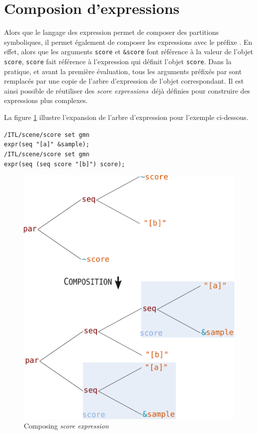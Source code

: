 \documentclass{article}
\newcommand{\OSC}[1]{\texttt{#1}}
\newcommand{\oper}[1]{\textcolor{figRed}{#1}}
\newcommand{\param}[1]{\textcolor{figOrange}{#1}}
\newcommand{\prefix}[1]{\textcolor{figBlue}{#1}}
\newcommand{\sExpr}{\emph{score expression}}
\newcommand{\sExprs}{\emph{score expressions}}
\newcommand{\lowTilde}{\texttildelow}
\newcommand{\tab}{\hspace*{4mm}}
\newcommand{\sample}	[1]			{\vspace{-0.2em}\begin{center}\colorbox{mygrey}{\begin{minipage}[t]{0.97\columnwidth} {\small \texttt{#1}}\end{minipage}}\end{center}}
\begin{document}
\section{Composion d'expressions}
\label{composingExpr}
Alors que le langage des expression permet de composer des partitions symboliques, il permet également de composer les expressions avec le préfixe  \OSC{\prefix{\lowTilde}}. En effet, alors que les arguments \OSC{\param{score}} et \OSC{\prefix{\&}\param{score}} font référence à la valeur de l'objet \OSC{score}, \OSC{\prefix{\lowTilde}\param{score}} fait référence à l'expression qui définit l'objet \OSC{score}. Dans la pratique, et avant la première évaluation, tous les arguments préfixés par \OSC{\prefix{\lowTilde}} sont remplacés par une copie de l'arbre d'expression de l'objet correspondant. Il est ainsi possible de réutiliser des \sExprs\ déjà définies pour construire des expressions plus complexes.

La figure \ref{fig:expandingTree} illustre l'expansion de l'arbre d'expression pour l'exemple ci-dessous.

\sample{/ITL/scene/score set gmn\\
\tab expr(\oper{seq} \param{"[a]"} \prefix{\&}\param{sample});\\
/ITL/scene/score set gmn  \\
\tab expr(\oper{seq} (\oper{seq} \prefix{\lowTilde}\param{score} \param{"[b]"}) \prefix{\lowTilde}\param{score});
}

\begin{figure}[th]
\centering
\includegraphics[width=0.9\columnwidth]{imgs/expandingTree}
\caption{Composing \sExpr
\label{fig:expandingTree}}
\end{figure}
\end{document}
